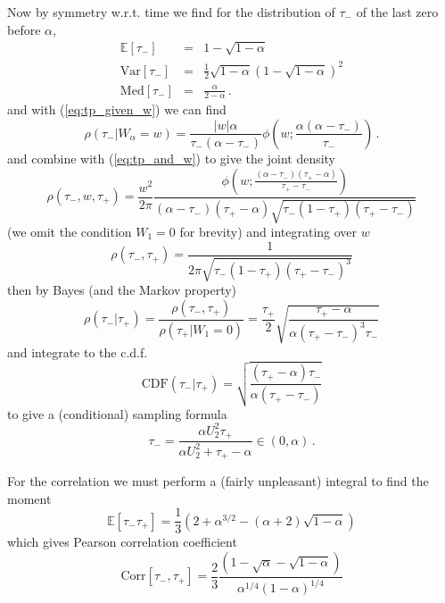 \documentclass{article}
\newcommand{\tm}{{\tau_{\mathrm{-}}}}
\newcommand{\tp}{{\tau_{\mathrm{+}}}}
\newcommand{\Var}{\mathrm{Var}}
\newcommand{\Med}{\mathrm{Med}}
\begin{document}
Now by symmetry w.r.t. time we find for the distribution of $\tm$ of the last zero before $\alpha$,
\begin{eqnarray}
\mathbb{E}\left[\tm\right] &=& 1-\sqrt{1-\alpha} \\
\Var\left[\tm\right] &=& \frac{1}{2}\sqrt{1-\alpha}\left(1-\sqrt{1-\alpha}\right)^2 \\
\Med\left[\tm\right] &=&  \frac{\alpha}{2-\alpha} \, .
\end{eqnarray}
and with (\ref{eq:tp_given_w}) we can find 
\begin{equation}
  \rho\left(\tm | W_\alpha=w\right) =  \frac{|w|\alpha}{\tm(\alpha-\tm)}\phi\left(w;\frac{\alpha(\alpha-\tm)}\tm\right) \label{eq:tm_given_w} \,.
\end{equation}
and combine with (\ref{eq:tp_and_w}) to give the joint density
\begin{equation}\label{eq:lwf}
\rho(\tm,w,\tp) = \frac{w^2}{2\pi} \frac{\phi\left(w;\frac{(\alpha-\tm)(\tp-\alpha)}{\tp-\tm}\right)}{(\alpha-\tm)(\tp-\alpha)\sqrt{\tm(1-\tp)(\tp-\tm)}} 
\end{equation}
(we omit the condition $W_1=0$ for brevity) and integrating over $w$
\begin{equation}\label{eq:tm_and_tp}
\rho(\tm,\tp) = \frac{1}{2\pi \sqrt{\tm(1-\tp)(\tp-\tm)^3}}
\end{equation}
then by Bayes (and the Markov property)
\begin{equation}
\rho(\tm|\tp) = \frac{\rho(\tm,\tp)}{\rho(\tp|W_1=0)} = \frac{\tp}{2} \sqrt{\frac{\tp-\alpha}{\alpha(\tp-\tm)^3\tm}}
\end{equation}
and integrate to the c.d.f.
\begin{equation}
  \textrm{CDF}(\tm|\tp) = \sqrt{\frac{(\tp-\alpha)\tm}{\alpha(\tp-\tm)}}
\end{equation}
to give a (conditional) sampling formula
\begin{equation}\label{eq:tm_sample}
\tm =  \frac{\alpha U_2^2 \tp}{\alpha U_2^2 + \tp - \alpha} \in \left(0,\alpha\right) \, .
\end{equation}

For the correlation we must perform a (fairly unpleasant) integral to find the moment
\begin{equation}\label{eq:tptm}
 \mathbb{E} \left[\tm\tp\right] =  \frac{1}{3} \left(2 + \alpha^{3/2} - \left(\alpha+2\right)\sqrt{1-\alpha}\right)
\end{equation}
which gives Pearson correlation coefficient
\begin{equation}\label{eq:corr}
 \mathrm{Corr} \left[\tm,\tp\right] =  \frac{2}{3} \frac{\left(1-\sqrt{\alpha}-\sqrt{1-\alpha}\right)}{\alpha^{1/4}\left(1-\alpha\right)^{1/4}}
\end{equation}
\end{document}
